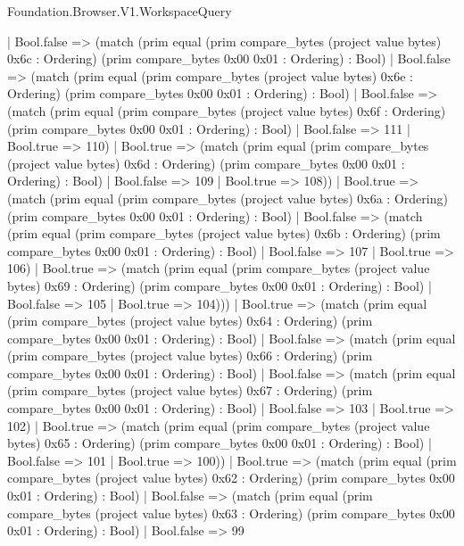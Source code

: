 \begin{lexlean}{Foundation.Browser.V1.WorkspaceQuery}
\begin{semanticmodule}
{              | Bool.false => (match (prim equal (prim compare_bytes (project value bytes) 0x6c : Ordering) (prim compare_bytes 0x00 0x01 : Ordering) : Bool)
                | Bool.false => (match (prim equal (prim compare_bytes (project value bytes) 0x6e : Ordering) (prim compare_bytes 0x00 0x01 : Ordering) : Bool)
                  | Bool.false => (match (prim equal (prim compare_bytes (project value bytes) 0x6f : Ordering) (prim compare_bytes 0x00 0x01 : Ordering) : Bool)
                    | Bool.false => 111
                    | Bool.true => 110)
                  | Bool.true => (match (prim equal (prim compare_bytes (project value bytes) 0x6d : Ordering) (prim compare_bytes 0x00 0x01 : Ordering) : Bool)
                    | Bool.false => 109
                    | Bool.true => 108))
                | Bool.true => (match (prim equal (prim compare_bytes (project value bytes) 0x6a : Ordering) (prim compare_bytes 0x00 0x01 : Ordering) : Bool)
                  | Bool.false => (match (prim equal (prim compare_bytes (project value bytes) 0x6b : Ordering) (prim compare_bytes 0x00 0x01 : Ordering) : Bool)
                    | Bool.false => 107
                    | Bool.true => 106)
                  | Bool.true => (match (prim equal (prim compare_bytes (project value bytes) 0x69 : Ordering) (prim compare_bytes 0x00 0x01 : Ordering) : Bool)
                    | Bool.false => 105
                    | Bool.true => 104)))
              | Bool.true => (match (prim equal (prim compare_bytes (project value bytes) 0x64 : Ordering) (prim compare_bytes 0x00 0x01 : Ordering) : Bool)
                | Bool.false => (match (prim equal (prim compare_bytes (project value bytes) 0x66 : Ordering) (prim compare_bytes 0x00 0x01 : Ordering) : Bool)
                  | Bool.false => (match (prim equal (prim compare_bytes (project value bytes) 0x67 : Ordering) (prim compare_bytes 0x00 0x01 : Ordering) : Bool)
                    | Bool.false => 103
                    | Bool.true => 102)
                  | Bool.true => (match (prim equal (prim compare_bytes (project value bytes) 0x65 : Ordering) (prim compare_bytes 0x00 0x01 : Ordering) : Bool)
                    | Bool.false => 101
                    | Bool.true => 100))
                | Bool.true => (match (prim equal (prim compare_bytes (project value bytes) 0x62 : Ordering) (prim compare_bytes 0x00 0x01 : Ordering) : Bool)
                  | Bool.false => (match (prim equal (prim compare_bytes (project value bytes) 0x63 : Ordering) (prim compare_bytes 0x00 0x01 : Ordering) : Bool)
                    | Bool.false => 99
}
\end{semanticmodule}
\end{lexlean}
